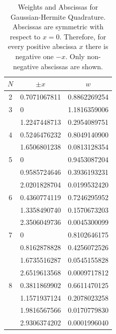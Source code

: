 \newpage
\begin{table}[h]
\caption{Weights and Abscissas for Gaussian-Hermite Quadrature.
Abscissas are symmetric with respect to $x=0$.  Therefore, for every positive abscissa $x$ there is negative one $-x$. Only non-negative abscissas are shown.}
\footnotesize
\begin{center}
\begin{tabular}{|c|ll|}
\hline
\multicolumn{1}{|c|}{$N$} & \multicolumn{1}{c}{$\pm x$} & \multicolumn{1}{c|}{$w$}\\
\hline
2 
  & 0.7071067811 & 0.8862269254\\
\hline
3 
  & 0            & 1.1816359006\\
  & 1.2247448713 & 0.2954089751\\
\hline
4 
  & 0.5246476232 & 0.8049140900\\
  & 1.6506801238 & 0.0813128354\\
\hline
5 & 0            & 0.9453087204\\
  & 0.9585724646 & 0.3936193231\\
  & 2.0201828704 & 0.0199532420\\
\hline
6 & 0.4360774119 & 0.7246295952\\
  & 1.3358490740 & 0.1570673203\\
  & 2.3506049736 & 0.0045300099\\
\hline
7 & 0            & 0.8102646175\\
  & 0.8162878828 & 0.4256072526\\
  & 1.6735516287 & 0.0545155828\\
  & 2.6519613568 & 0.0009717812\\
\hline
8 & 0.3811869902 & 0.6611470125\\
  & 1.1571937124 & 0.2078023258\\
  & 1.9816567566 & 0.0170779830\\
  & 2.9306374202 & 0.0001996040\\
  \hline
\end{tabular}\label{tab:Gaussian-Hermite}
\end{center}
\end{table}

\vfill
\newpage

